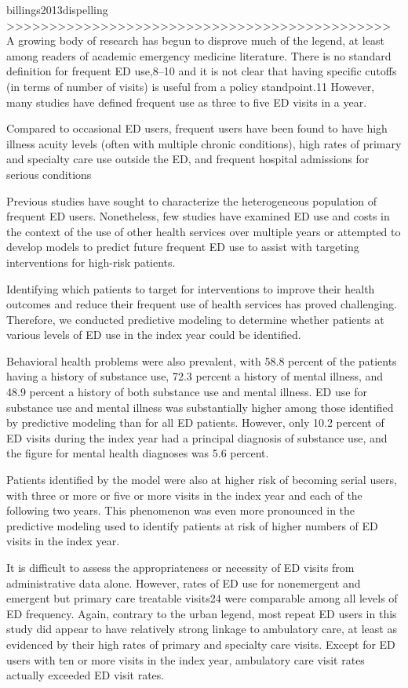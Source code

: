 billings2013dispelling
>>>>>>>>>>>>>>>>>>>>>>>>>>>>>>>>>>>>>>>>>>>>>
A growing body of research has begun to disprove much of the legend, at least among readers of academic emergency medicine literature. There is no standard definition for frequent ED use,8–10 and it is not clear that having specific cutoffs (in terms of number of visits) is useful from a policy standpoint.11 However, many studies have defined frequent use as three to five ED visits in a year.

Compared to occasional ED users, frequent users have been found to have high illness acuity levels (often with multiple chronic conditions), high rates of primary and specialty care use outside the ED, and frequent hospital admissions for serious conditions

Previous studies have sought to characterize the heterogeneous population of frequent ED users. Nonetheless, few studies have examined ED use and costs in the context of the use of other health services over multiple years or attempted to develop models to predict future frequent ED use to assist with targeting interventions for high-risk patients.

Identifying which patients to target for interventions to improve their health outcomes and reduce their frequent use of health services has proved challenging. Therefore, we conducted predictive modeling to determine whether patients at various levels of ED use in the index year could be identified.

Behavioral health problems were also prevalent, with 58.8 percent of the patients having a history of substance use, 72.3 percent a history of mental illness, and 48.9 percent a history of both substance use and mental illness. ED use for substance use and mental illness was substantially higher among those identified by predictive modeling than for all ED patients. However, only 10.2 percent of ED visits during the index year had a principal diagnosis of substance use, and the figure for mental health diagnoses was 5.6 percent.

Patients identified by the model were also at higher risk of becoming serial users, with three or more or five or more visits in the index year and each of the following two years. This phenomenon was even more pronounced in the predictive modeling used to identify patients at risk of higher numbers of ED visits in the index year.

It is difficult to assess the appropriateness or necessity of ED visits from administrative data alone. However, rates of ED use for nonemergent and emergent but primary care treatable visits24 were comparable among all levels of ED frequency. Again, contrary to the urban legend, most repeat ED users in this study did appear to have relatively strong linkage to ambulatory care, at least as evidenced by their high rates of primary and specialty care visits. Except for ED users with ten or more visits in the index year, ambulatory care visit rates actually exceeded ED visit rates.

